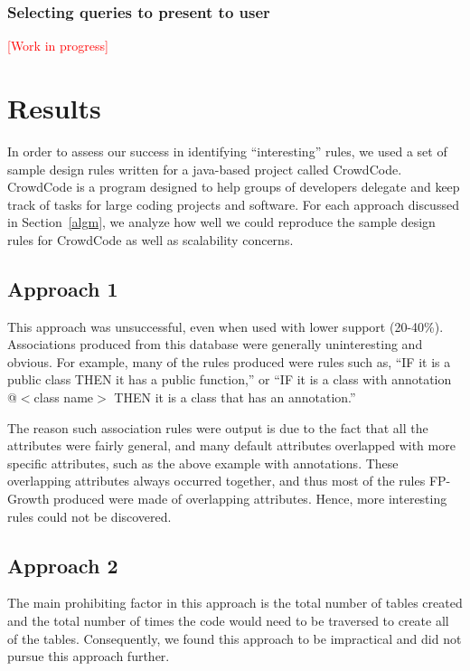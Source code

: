 \documentclass[12pt]{article}
\newcommand{\tcr}{\textcolor{red}}
\begin{document}

\subsubsection{Selecting queries to present to user}

\tcr{[Work in progress]}

\clearpage

\section{Results} \label{results}
In order to assess our success in identifying “interesting” rules, we used a set of sample design rules written for a java-based project called CrowdCode. CrowdCode is a program designed to help groups of developers delegate and keep track of tasks for large coding projects and software. For each approach discussed in Section~\ref{algm}, we analyze how well we could reproduce the sample design rules for CrowdCode as well as scalability concerns.


	\subsection{Approach 1}
	This approach was unsuccessful, even when used with lower support (20-40\%). Associations produced from this database were generally uninteresting and obvious. For example, many of the rules produced were rules such as, “IF it is a public class THEN it has a public function,” or “IF it is a class with annotation @$<$class name$>$ THEN it is a class that has an annotation.”

The reason such association rules were output is due to the fact that all the attributes were fairly general, and many default attributes overlapped with more specific attributes, such as the above example with annotations. These overlapping attributes always occurred together, and thus most of the rules FP-Growth produced were made of overlapping attributes. Hence, more interesting rules could not be discovered.

	\subsection{Approach 2}
	The main prohibiting factor in this approach is the total number of tables created and the total number of times the code would need to be traversed to create all of the tables. Consequently, we found this approach to be impractical and did not pursue this approach further.
\end{document}
